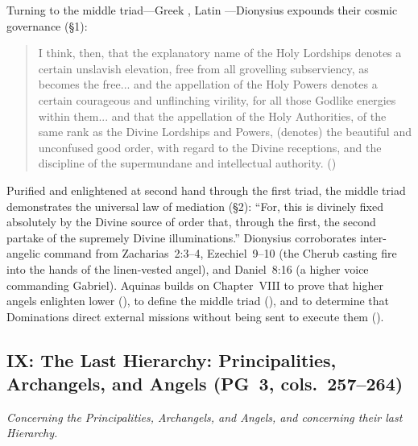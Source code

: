 Turning to the middle triad---Greek , Latin ---Dionysius expounds their cosmic governance (\S 1):
\begin{quotation}
I think, then, that the explanatory name of the Holy Lordships denotes a certain unslavish elevation, free from all grovelling subserviency, as becomes the free... and the appellation of the Holy Powers denotes a certain courageous and unflinching virility, for all those Godlike energies within them... and that the appellation of the Holy Authorities, of the same rank as the Divine Lordships and Powers, (denotes) the beautiful and unconfused good order, with regard to the Divine receptions, and the discipline of the supermundane and intellectual authority. ()
\end{quotation}
Purified and enlightened at second hand through the first triad, the middle triad demonstrates the universal law of mediation (\S 2): ``For, this is divinely fixed absolutely by the Divine source of order that, through the first, the second partake of the supremely Divine illuminations.'' Dionysius corroborates inter-angelic command from Zacharias~2:3--4, Ezechiel~9--10 (the Cherub casting fire into the hands of the linen-vested angel), and Daniel~8:16 (a higher voice commanding Gabriel). Aquinas builds on Chapter~VIII to prove that higher angels enlighten lower (), to define the middle triad (), and to determine that Dominations direct external missions without being sent to execute them ().

\subsection{IX: The Last Hierarchy: Principalities, Archangels, and Angels (PG~3, cols.~257--264)}
\label{sec:ch-ix}
\emph{Concerning the Principalities, Archangels, and Angels, and concerning their last Hierarchy.}

